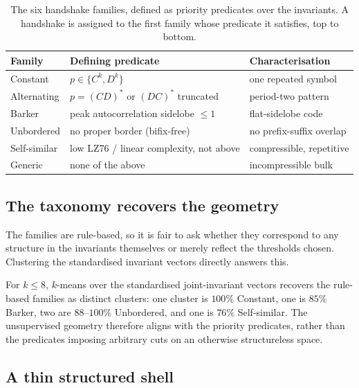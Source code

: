 \begin{table}[t]
\caption{The six handshake families, defined as priority predicates over the invariants.
A handshake is assigned to the first family whose predicate it satisfies, top to bottom.}
\label{tab:families}
\centering
\begin{tabular}{@{}lll@{}}
\toprule
Family & Defining predicate & Characterisation \\
\midrule
Constant     & $p \in \{C^k, D^k\}$                          & one repeated symbol \\
Alternating  & $p = (CD)^{\ast}$ or $(DC)^{\ast}$ truncated  & period-two pattern \\
Barker       & peak autocorrelation sidelobe $\le 1$         & flat-sidelobe code \\
Unbordered   & no proper border (bifix-free)                 & no prefix-suffix overlap \\
Self-similar & low LZ76 / linear complexity, not above       & compressible, repetitive \\
Generic      & none of the above                             & incompressible bulk \\
\bottomrule
\end{tabular}
\end{table}

\subsection{The taxonomy recovers the geometry}

The families are rule-based, so it is fair to ask whether they correspond to any
structure in the invariants themselves or merely reflect the thresholds chosen.
Clustering the standardised invariant vectors directly answers this.

\begin{observation}
\label{obs:kmeans}
For $k\le 8$, $k$-means over the standardised joint-invariant vectors recovers the
rule-based families as distinct clusters: one cluster is $100\%$ Constant, one is $85\%$
Barker, two are $88$--$100\%$ Unbordered, and one is $76\%$ Self-similar. The
unsupervised geometry therefore aligns with the priority predicates, rather than the
predicates imposing arbitrary cuts on an otherwise structureless space.
\end{observation}

\subsection{A thin structured shell}

